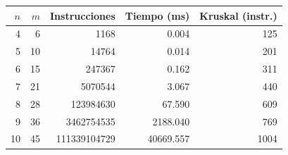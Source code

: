\begin{tabular}{rrrrr}
\toprule
$n$ & $m$ & Instrucciones & Tiempo (ms) & Kruskal (instr.)\\
\midrule
4 & 6 & 1168 & 0.004 & 125\\
5 & 10 & 14764 & 0.014 & 201\\
6 & 15 & 247367 & 0.162 & 311\\
7 & 21 & 5070544 & 3.067 & 440\\
8 & 28 & 123984630 & 67.590 & 609\\
9 & 36 & 3462754535 & 2188.040 & 769\\
10 & 45 & 111339104729 & 40669.557 & 1004\\
\bottomrule
\end{tabular}
